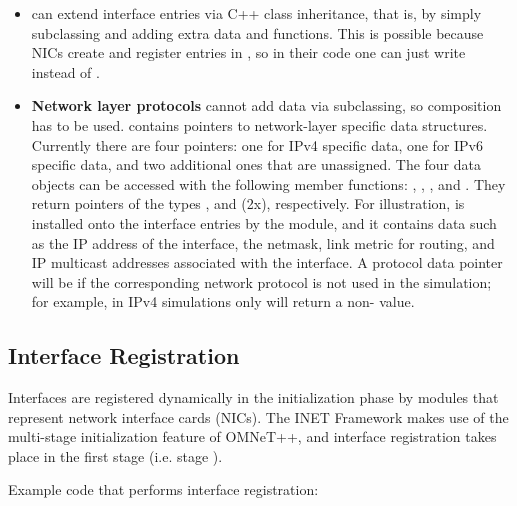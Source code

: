 \begin{itemize}

\item {} can extend interface entries via C++ class inheritance, that is, by
simply subclassing  and adding extra data and
functions. This is possible because NICs create and register entries in
, so in their code one can just write
 instead of .

\item \textbf{Network layer protocols} cannot add data via subclassing, so
composition has to be used.  contains pointers to
network-layer specific data structures. Currently there are four pointers:
one for IPv4 specific data, one for IPv6 specific data, and two additional
ones that are unassigned. The four data objects can be accessed with the
following  member functions: ,
, , and .
They return pointers of the types ,
 and  (2x),
respectively. For illustration,  is installed
onto the interface entries by the  module, and it
contains data such as the IP address of the interface, the netmask, link
metric for routing, and IP multicast addresses associated with the
interface. A protocol data pointer will be  if the corresponding
network protocol is not used in the simulation; for example, in IPv4
simulations only  will return a non- value.


\end{itemize}


\subsection{Interface Registration}

Interfaces are registered dynamically in the initialization phase by modules
that represent network interface cards (NICs). The INET Framework makes use
of the multi-stage initialization feature of OMNeT++, and interface registration takes
place in the first stage (i.e. stage ).

Example code that performs interface registration:

